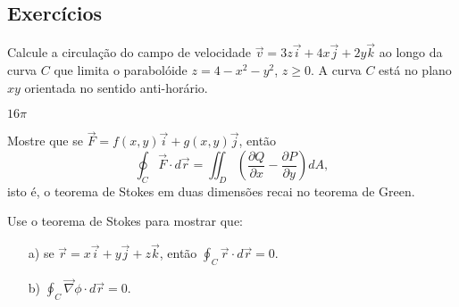 \subsection*{Exercícios}
\begin{exer}
 Calcule a circulação do campo de velocidade $\vec{v}=3z\vec{i}+4x\vec{j}+2y\vec{k}$ ao longo da curva $C$ que limita o parabolóide $z=4-x^2-y^2$, $z\geq 0$. A curva $C$ está no plano $xy$ orientada no sentido anti-horário.
 \end{exer}
\begin{resp}
 $16\pi$
\end{resp}
\begin{exer}Mostre que se $\vec{F}=f(x,y)\vec{i}+g(x,y)\vec{j}$, então
$$
\oint_C  \vec{F} \cdot d\vec{r}=\iint_{D} \left(\frac{\partial Q}{\partial x} - \frac{\partial P}{\partial
y}\right) dA,
$$
isto é, o teorema de Stokes em duas dimensões recai no teorema de Green.
\end{exer}
\begin{exer}Use o teorema de Stokes para mostrar que:
\begin{itemize}
 \item[a)] se $\vec{r}=x\vec{i}+y\vec{j}+z\vec{k}$, então $\oint_C\vec{r}\cdot d\vec{r}=0$.
 \item[b)] $\oint_C\vec{\nabla}\phi\cdot d\vec{r}=0$. 
\end{itemize}
\end{exer}
